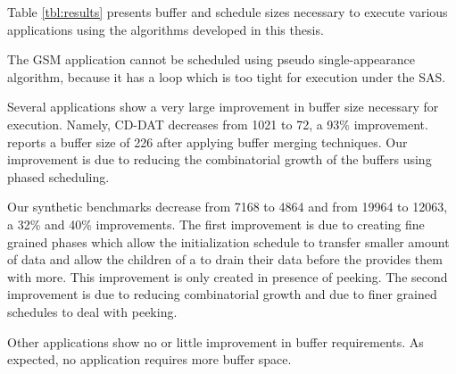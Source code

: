 \begin{comment}
\begin{figure}
\centering \psfig{figure=kz-1.eps,width=6in} \caption[Buffer
storage space savings of Phased Minimal Latency schedule vs.
Hierarchical schedule.]{Buffer storage space savings of Phased
Minimal Latency schedule vs. Hierarchical schedule. All data in
all {\Channels} is assume to consume same amount of space.}
\end{figure}

\begin{figure}
\centering \psfig{figure=kz-2.eps,width=6in} \caption[Storage
usage comparison]{Storage usage for compressed Minimal Latency
Phased schedule vs. Hierarchical schedule. Left bars are for
Hierarchical schedules. Numbers are normalized to total storage
required by Hierarchical schedule. Each entry in every schedule
and data items in all {\Channels} are assumed to consume same
amount of space.}
\end{figure}
\end{comment}

Table \ref{tbl:results} presents buffer and schedule sizes
necessary to execute various applications using the algorithms
developed in this thesis.

The GSM application cannot be scheduled using pseudo
single-appearance algorithm, because it has a loop which is too
tight for execution under the SAS.

Several applications show a very large improvement in buffer size
necessary for execution.  Namely, CD-DAT decreases from 1021 to
72, a 93\% improvement. \cite{murthy99buffer} reports a buffer
size of 226 after applying buffer merging techniques. Our
improvement is due to reducing the combinatorial growth of the
buffers using phased scheduling.

Our synthetic benchmarks decrease from 7168 to 4864 and from 19964
to 12063, a 32\% and 40\% improvements. The first improvement is
due to creating fine grained phases which allow the initialization
schedule to transfer smaller amount of data and allow the children
of a {\splitjoin} to drain their data before the {\splitter}
provides them with more. This improvement is only created in
presence of peeking. The second improvement is due to reducing
combinatorial growth and due to finer grained schedules to deal
with peeking.

Other applications show no or little improvement in buffer
requirements. As expected, no application requires more buffer
space.

